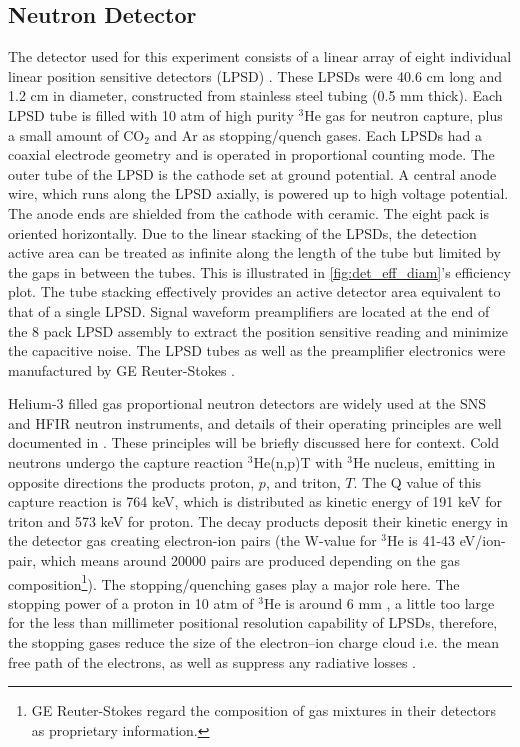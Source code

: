 \subsection{Neutron Detector}

The detector used for this experiment consists of a linear array of eight individual linear position sensitive detectors (LPSD) \cite{Berry2012, Diawara2023}. These LPSDs were 40.6 cm long and 1.2 cm in diameter, constructed from stainless steel tubing (0.5 mm thick). Each LPSD tube is filled with 10 atm of high purity $^3$He gas for neutron capture, plus a small amount of CO$_2$ and Ar as stopping/quench gases. Each LPSDs had a coaxial electrode geometry and is operated in proportional counting mode. The outer tube of the LPSD is the cathode set at ground potential. A central anode wire, which runs along the LPSD axially, is powered up to high voltage potential. The anode ends are shielded from the cathode with ceramic. The eight pack is oriented horizontally. Due to the linear stacking of the LPSDs, the detection active area can be treated as infinite along the length of the tube but limited by the gaps in between the tubes. This is illustrated in \cref{fig:det_eff_diam}'s efficiency plot. The tube stacking effectively provides an active detector area equivalent to that of a single LPSD. Signal waveform preamplifiers are located at the end of the 8 pack LPSD assembly to extract the position sensitive reading and minimize the capacitive noise. The LPSD tubes as well as the preamplifier electronics were manufactured by GE Reuter-Stokes \cite{Berry2012}. 

Helium-3 filled gas proportional neutron detectors are widely used at the SNS and HFIR neutron instruments, and details of their operating principles are well documented in \cite{Knoll2010, Diawara2023}. These principles will be briefly discussed here for context. Cold neutrons undergo the capture reaction $^3$He(n,p)T with $^3$He nucleus, emitting in opposite directions the products proton, $p$, and triton, $T$. The Q value of this capture reaction is 764 keV, which is distributed as kinetic energy of 191 keV for triton and 573 keV for proton. The decay products deposit their kinetic energy in the detector gas creating electron-ion pairs (the W-value \cite{Bichsel1979} for $^3$He is 41-43 eV/ion-pair, which means around 20000 pairs are produced depending on the gas composition\footnote{GE Reuter-Stokes regard the composition of gas mixtures in their detectors as proprietary information.}). The stopping/quenching gases play a major role here. The stopping power of a proton in 10 atm of $^3$He is around 6 mm \cite{Crawford1992}, a little too large for the less than millimeter positional resolution capability of LPSDs, therefore, the stopping gases reduce the size of the electron–ion charge cloud i.e. the mean free path of the electrons, as well as suppress any radiative losses \cite{Doumas2012}.


